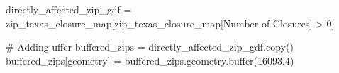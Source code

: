 \documentclass[
  letterpaper,
  DIV=11,
  numbers=noendperiod]{scrartcl}
\newenvironment{Shaded}{\begin{snugshade}}{\end{snugshade}}
\newcommand{\BuiltInTok}[1]{\textcolor[rgb]{0.00,0.23,0.31}{#1}}
\newcommand{\CommentTok}[1]{\textcolor[rgb]{0.37,0.37,0.37}{#1}}
\newcommand{\DecValTok}[1]{\textcolor[rgb]{0.68,0.00,0.00}{#1}}
\newcommand{\FloatTok}[1]{\textcolor[rgb]{0.68,0.00,0.00}{#1}}
\newcommand{\NormalTok}[1]{\textcolor[rgb]{0.00,0.23,0.31}{#1}}
\newcommand{\OperatorTok}[1]{\textcolor[rgb]{0.37,0.37,0.37}{#1}}
\newcommand{\StringTok}[1]{\textcolor[rgb]{0.13,0.47,0.30}{#1}}
\begin{document}
\begin{Shaded}
\begin{Highlighting}[]
\NormalTok{directly\_affected\_zip\_gdf }\OperatorTok{=}\NormalTok{ zip\_texas\_closure\_map[zip\_texas\_closure\_map[}\StringTok{\textquotesingle{}Number of Closures\textquotesingle{}}\NormalTok{] }\OperatorTok{\textgreater{}} \DecValTok{0}\NormalTok{]}
\end{Highlighting}
\end{Shaded}

\begin{Shaded}
\begin{Highlighting}[]
\CommentTok{\# Adding uffer}
\NormalTok{buffered\_zips }\OperatorTok{=}\NormalTok{ directly\_affected\_zip\_gdf.copy()}
\NormalTok{buffered\_zips[}\StringTok{\textquotesingle{}geometry\textquotesingle{}}\NormalTok{] }\OperatorTok{=}\NormalTok{ buffered\_zips.geometry.}\BuiltInTok{buffer}\NormalTok{(}\FloatTok{16093.4}\NormalTok{)}
\end{Highlighting}
\end{Shaded}
\end{document}
